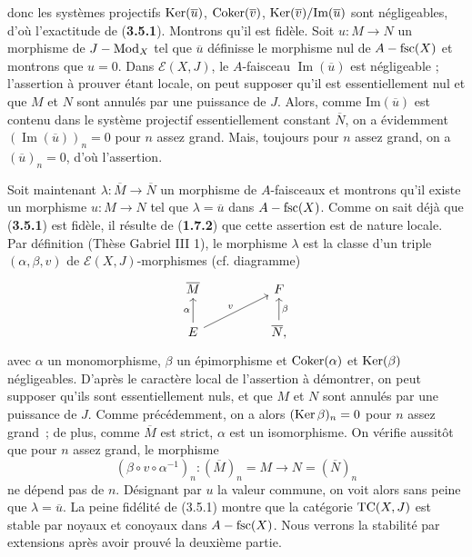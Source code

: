 donc les systèmes projectifs $\operatorname{Ker} (\overline{u})$, $\operatorname{Coker} (\overline{v})$, $\operatorname{Ker} (\overline{v})/\text{Im} (\overline{u})$ sont négligeables, d'où l'exactitude de ({\bf 3.5.1}). Montrons qu'il est fidèle. Soit $u: M \to N$ un morphisme de $J-\operatorname{Mod}_X$ tel que $\overline{u}$ définisse le morphisme nul de $A-\operatorname{fsc}(X)$ et montrons que $u = 0$. Dans $\mathcal{E}(X, J)$, le $A$-faisceau $\operatorname{Im}(\overline{u})$ est négligeable ; l'assertion à prouver étant locale, on peut supposer qu'il est essentiellement nul et que $M$ et $N$ sont annulés par une puissance de $J$. Alors, comme $\text{Im}(\overline{u})$ est contenu dans le système projectif essentiellement constant $\overline{N}$, on a évidemment $(\operatorname{Im}(\overline{u}))_n = 0$ pour $n$ assez grand. Mais, toujours pour $n$ assez grand, on a $(\overline{u})_n = 0$, d'où l'assertion.

Soit maintenant $\lambda: \overline{M} \to \overline{N}$ un morphisme de $A$-faisceaux et montrons qu'il existe un morphisme $u: M \to N$ tel que $\lambda = \overline{u}$ dans $A-\operatorname{fsc}(X)$. Comme on sait déjà que ({\bf 3.5.1}) est fidèle, il résulte de ({\bf 1.7.2}) que cette assertion est de nature locale. Par définition (Thèse Gabriel III 1), le morphisme $\lambda$ est la classe d'un triple $(\alpha, \beta, v)$ de $\mathscr{E}(X, J)$-morphismes (cf. diagramme)
\[\begin{tikzcd}
	{\overline{M}} && F \\
	E && {\overline{N},}
	\arrow["\beta"', from=2-3, to=1-3]
	\arrow["v", from=2-1, to=1-3]
	\arrow["\alpha", from=2-1, to=1-1]
\end{tikzcd}\]
avec $\alpha$ un monomorphisme, $\beta$ un épimorphisme et $\operatorname{Coker}(\alpha)$ et $\operatorname{Ker} (\beta)$ négligeables. D'après le caractère local de l'assertion à démontrer, on peut supposer qu'ils sont essentiellement nuls, et que $M$ et $N$ sont annulés par une puissance de $J$. Comme précédemment, on a alors $(\operatorname{Ker} \beta)_n = 0$ pour $n$ assez grand~; de plus, comme $\overline{M}$ est strict, $\alpha$ est un isomorphisme. On vérifie aussitôt que pour $n$ assez grand, le morphisme
$$
(\beta \circ v \circ \alpha^{-1})_n : (\overline{M})_n = M \to N = (\overline{N})_n
$$
ne dépend pas de $n$. Désignant par $u$ la valeur commune, on voit alors sans peine que $\lambda = \overline{u}$. La peine fidélité de (3.5.1) montre que la catégorie $\operatorname{TC} (X, J)$ est stable par noyaux et conoyaux dans $A-\operatorname{fsc}(X)$. Nous verrons la stabilité par extensions après avoir prouvé la deuxième partie.

